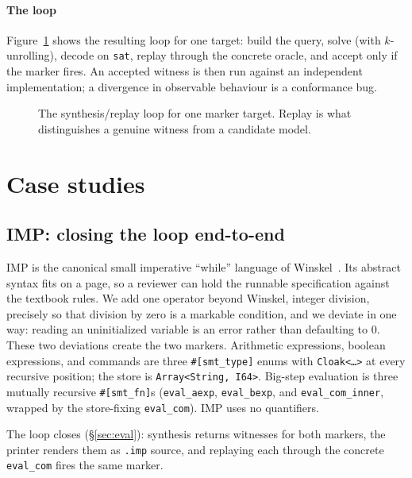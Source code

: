 \documentclass[sigplan,review,anonymous]{acmart}
\theoremstyle{definition}
\theoremstyle{remark}
\newcommand{\imp}{IMP}
\newcommand{\code}[1]{\texttt{#1}}
\begin{document}
\paragraph{The loop}
Figure~\ref{fig:loop} shows the resulting loop for one target: build the query,
solve (with $k$-unrolling), decode on \code{sat}, replay through the concrete
oracle, and accept only if the marker fires. An accepted witness is then run
against an independent implementation; a divergence in observable behaviour is a
conformance bug.

\begin{figure}[t]
\centering
\resizebox{\columnwidth}{!}{}
\caption{The synthesis/replay loop for one marker target. Replay is what
distinguishes a genuine witness from a candidate model.}
\label{fig:loop}
\end{figure}

\section{Case studies}
\label{sec:cases}

\subsection{\imp{}: closing the loop end-to-end}
\label{sec:imp}

\imp{} is the canonical small imperative ``while'' language of
Winskel~\cite{winskel1993}. Its abstract syntax fits on a page, so a reviewer can
hold the runnable specification against the textbook rules. We add one operator
beyond Winskel, integer division, precisely so that division by zero is a markable
condition, and we deviate in one way: reading an uninitialized variable is an
error rather than defaulting to $0$. These two deviations create the two markers.
Arithmetic expressions, boolean expressions, and commands are three
\code{\#[smt\_type]} enums with \code{Cloak<\dots>} at every recursive position;
the store is \code{Array<String, I64>}. Big-step evaluation is three mutually
recursive \code{\#[smt\_fn]}s (\code{eval\_aexp}, \code{eval\_bexp}, and
\code{eval\_com\_inner}, wrapped by the store-fixing \code{eval\_com}). \imp{}
uses no quantifiers.

The loop closes (\S\ref{sec:eval}): synthesis returns witnesses for both markers,
the printer renders them as \code{.imp} source, and replaying each through the
concrete \code{eval\_com} fires the same marker.
\end{document}
